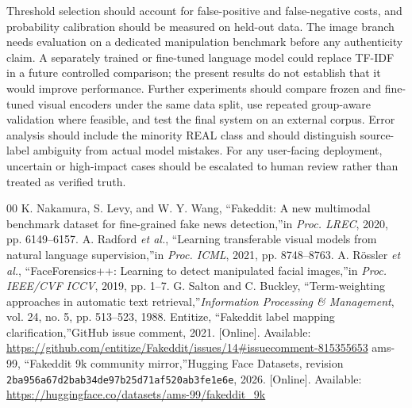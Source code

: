 \documentclass[conference]{IEEEtran}
\begin{document}
Threshold selection should account for false-positive and false-negative costs, and probability calibration should be measured on held-out data. The image branch needs evaluation on a dedicated manipulation benchmark before any authenticity claim. A separately trained or fine-tuned language model could replace TF-IDF in a future controlled comparison; the present results do not establish that it would improve performance. Further experiments should compare frozen and fine-tuned visual encoders under the same data split, use repeated group-aware validation where feasible, and test the final system on an external corpus. Error analysis should include the minority REAL class and should distinguish source-label ambiguity from actual model mistakes. For any user-facing deployment, uncertain or high-impact cases should be escalated to human review rather than treated as verified truth.
\begin{thebibliography}{00}
 K. Nakamura, S. Levy, and W. Y. Wang, \textquotedblleft Fakeddit: A new multimodal benchmark dataset for fine-grained fake news detection,\textquotedblright in \textit{Proc. LREC}, 2020, pp. 6149--6157.
 A. Radford \textit{et al.}, \textquotedblleft Learning transferable visual models from natural language supervision,\textquotedblright in \textit{Proc. ICML}, 2021, pp. 8748--8763.
 A. R\"ossler \textit{et al.}, \textquotedblleft FaceForensics++: Learning to detect manipulated facial images,\textquotedblright in \textit{Proc. IEEE/CVF ICCV}, 2019, pp. 1--7.
 G. Salton and C. Buckley, \textquotedblleft Term-weighting approaches in automatic text retrieval,\textquotedblright \textit{Information Processing \& Management}, vol. 24, no. 5, pp. 513--523, 1988.
 Entitize, \textquotedblleft Fakeddit label mapping clarification,\textquotedblright GitHub issue comment, 2021. [Online]. Available: \url{https://github.com/entitize/Fakeddit/issues/14#issuecomment-815355653}
 ams-99, \textquotedblleft Fakeddit 9k community mirror,\textquotedblright Hugging Face Datasets, revision \texttt{2ba956a67d2bab34de97b25d71af520ab3fe1e6e}, 2026. [Online]. Available: \url{https://huggingface.co/datasets/ams-99/fakeddit\_9k}
\end{thebibliography}
\end{document}

